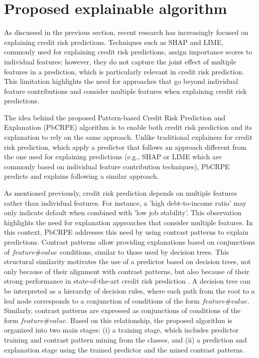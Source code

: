 \section{Proposed explainable algorithm}\label{sec:explainablealgorithm}
        As discussed in the previous section, recent research has increasingly focused on explaining credit risk predictions. Techniques such as SHAP and LIME, commonly used for explaining credit risk predictions, assign importance scores to individual features; however, they do not capture the joint effect of multiple features in a prediction, which is particularly relevant in credit risk prediction. This limitation highlights the need for approaches that go beyond individual feature contributions and consider multiple features when explaining credit risk predictions.\newline

    	The idea behind the proposed Pattern-based Credit Risk Prediction and Explanation (PbCRPE) algorithm is to enable both credit risk prediction and its explanation to rely on the same approach. Unlike traditional explainers for credit risk prediction, which apply a predictor that follows an approach different from the one used for explaining predictions (e.g., SHAP or LIME which are commonly based on individual feature contribution techniques), PbCRPE predicts and explains following a similar approach.\newline
    	
    	As mentioned previously, credit risk prediction depends on multiple features rather than individual features. For instance, a 'high debt-to-income ratio' may only indicate default when combined with 'low job stability'. This observation highlights the need for explanation approaches that consider multiple features. In this context, PbCRPE addresses this need by using contrast patterns to explain predictions. Contrast patterns allow providing explanations based on conjunctions of $feature\#value$ conditions, similar to those used by decision trees. This structural similarity motivates the use of a predictor based on decision trees, not only because of their alignment with contrast patterns, but also because of their strong performance in state-of-the-art credit risk prediction \cite{aruleba2025improved}. A decision tree can be interpreted as a hierarchy of decision rules, where each path from the root to a leaf node corresponds to a conjunction of conditions of the form $feature\#value$. Similarly, contrast patterns are expressed as conjunctions of conditions of the form $feature\#value$. Based on this relationship, the proposed algorithm is organized into two main stages: (i) a training stage, which includes predictor training and contrast pattern mining from the classes, and (ii) a prediction and explanation stage using the trained predictor and the mined contrast patterns.

